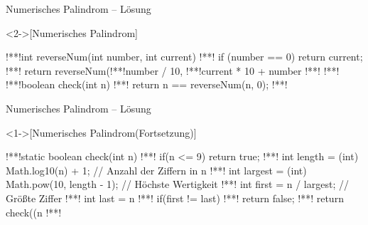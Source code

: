 \begin{frame}[fragile,c]{Numerisches Palindrom -- Lösung}
    \begin{solve}<2->[Numerisches Palindrom]
\begin{plainjava}
!**!int reverseNum(int number, int current) {
!**!    if (number == 0) return current;
!**!    return reverseNum(!**!number / 10, !**!current * 10 + number %
!**!}
!**!
!**!boolean check(int n) {
!**!    return n == reverseNum(n, 0);
!**!}
\end{plainjava}
    \end{solve}
\end{frame}

\begin{frame}[fragile,c]{Numerisches Palindrom -- Lösung}
    \addtocounter{solve}{-1}%
    \begin{solve}<1->[Numerisches Palindrom\hfill{}(Fortsetzung)]
\begin{plainjava}
!**!static boolean check(int n) {
!**!    if(n <= 9) return true;
!**!    int length = (int) Math.log10(n) + 1; // Anzahl der Ziffern in n
!**!    int largest = (int) Math.pow(10, length - 1); // Höchste Wertigkeit
!**!    int first = n / largest; // Größte Ziffer
!**!    int last = n %
!**!    if(first != last)
!**!        return false;
!**!    return check((n %
!**!}
\end{plainjava}
    \end{solve}
\end{frame}

